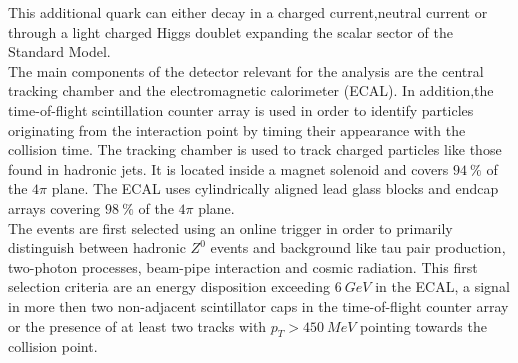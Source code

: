 \documentclass[11pt, twocolumn, a4paper]{article}
\begin{document}
This additional quark can either decay in a charged current,neutral current or through a light charged Higgs doublet expanding the scalar sector of the Standard Model.\\
The main components of the detector relevant for the analysis are the central tracking chamber and the electromagnetic calorimeter (ECAL).
In addition,the time-of-flight scintillation counter array is used in order to identify particles originating from the interaction point by timing their appearance with the collision time.
The tracking chamber is used to track charged particles like those found in hadronic jets.
It is located inside a magnet solenoid and covers $\SI{94}{\%}$ of the $4\pi$ plane.
The ECAL uses cylindrically aligned lead glass blocks and endcap arrays covering $\SI{98}{\%}$ of the $4\pi$ plane.\\
The events are first selected using an online trigger in order to primarily distinguish between hadronic $Z^0$ events and background like tau pair production, two-photon processes, beam-pipe interaction and cosmic radiation.
This first selection criteria are an energy disposition exceeding ${\SI{6}{GeV}}$ in the ECAL, a signal in more then two non-adjacent scintillator caps in the time-of-flight counter array or the presence of at least two tracks with $p_T > {\SI{450}{MeV}}$ pointing towards the collision point.\\
\end{document}
